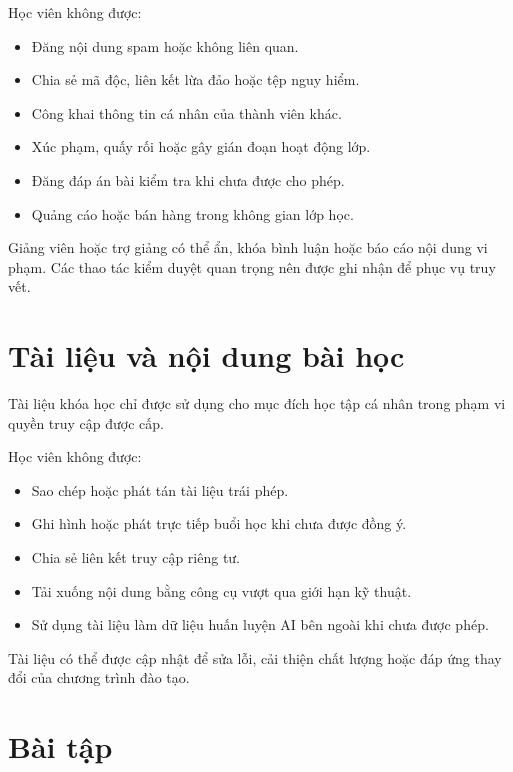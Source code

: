 \documentclass[12pt,a4paper]{article}
\begin{document}
Học viên không được:

\begin{itemize}
    \item Đăng nội dung spam hoặc không liên quan.
    \item Chia sẻ mã độc, liên kết lừa đảo hoặc tệp nguy hiểm.
    \item Công khai thông tin cá nhân của thành viên khác.
    \item Xúc phạm, quấy rối hoặc gây gián đoạn hoạt động lớp.
    \item Đăng đáp án bài kiểm tra khi chưa được cho phép.
    \item Quảng cáo hoặc bán hàng trong không gian lớp học.
\end{itemize}

Giảng viên hoặc trợ giảng có thể ẩn, khóa bình luận hoặc báo cáo nội dung vi phạm.
Các thao tác kiểm duyệt quan trọng nên được ghi nhận để phục vụ truy vết.

\section{Tài liệu và nội dung bài học}

Tài liệu khóa học chỉ được sử dụng cho mục đích học tập cá nhân
trong phạm vi quyền truy cập được cấp.

Học viên không được:

\begin{itemize}
    \item Sao chép hoặc phát tán tài liệu trái phép.
    \item Ghi hình hoặc phát trực tiếp buổi học khi chưa được đồng ý.
    \item Chia sẻ liên kết truy cập riêng tư.
    \item Tải xuống nội dung bằng công cụ vượt qua giới hạn kỹ thuật.
    \item Sử dụng tài liệu làm dữ liệu huấn luyện AI bên ngoài khi chưa được phép.
\end{itemize}

Tài liệu có thể được cập nhật để sửa lỗi, cải thiện chất lượng
hoặc đáp ứng thay đổi của chương trình đào tạo.

\section{Bài tập}
\end{document}
